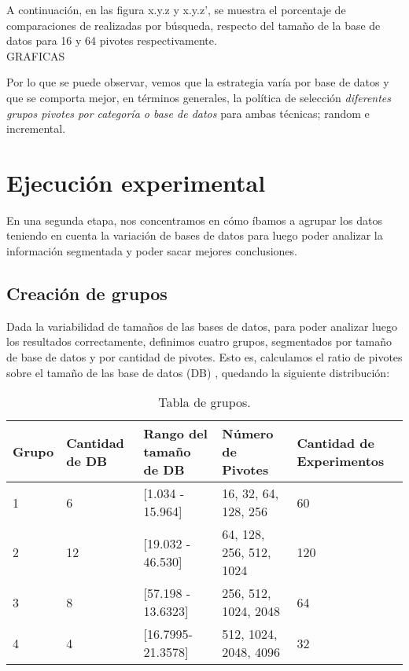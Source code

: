 A continuaci\'on, en las figura x.y.z y x.y.z’, se muestra el porcentaje de comparaciones de realizadas por b\'usqueda, respecto del tamaño de la base de datos para 16 y 64 pivotes respectivamente.\\

GRAFICAS

Por lo que se puede observar, vemos que la estrategia var\'ia por base de datos y que se comporta mejor, en t\'erminos generales, la pol\'itica de selecci\'on  \textit{diferentes grupos pivotes por categor\'ia o base de datos} para ambas t\'ecnicas; random e incremental.\\


\section{Ejecuci\'on experimental}

En una segunda etapa,  nos concentramos en c\'omo \'ibamos a agrupar los datos teniendo en cuenta la variaci\'on de bases de datos para luego poder analizar la informaci\'on segmentada y poder sacar mejores conclusiones.\\

\subsection{Creaci\'on de grupos}

Dada la variabilidad de tamaños de las bases de datos, para poder analizar luego los resultados correctamente, definimos cuatro grupos, segmentados por tamaño de base de datos y por cantidad de pivotes. Esto es, calculamos el ratio de pivotes sobre el tamaño de las base de datos (DB) , quedando la siguiente distribuci\'on:\\

\begin{table}[htbp]
\begin{center}
\begin{tabular}{|m{1.1cm}|m{1.8cm}|m{3.2cm}|m{2.2cm}|m{2.5cm}|}

\hline
Grupo & 
Cantidad de DB & 
Rango del tama\~no de DB & 
N\'umero de Pivotes &  
Cantidad de Experimentos\\
\hline \hline
1 & 
6 & 
[1.034 - 15.964] & 
16, 32, 64, 128, 256 & 
60  \\ \hline
2 &
12 &
[19.032 - 46.530] &
64, 128, 256, 512, 1024 &
120  \\ \hline
3 &
8 &
[57.198 - 13.6323] &
256, 512, 1024, 2048 &
64  \\ \hline
4 &
4 &
[16.7995- 21.3578] &
512, 1024, 2048, 4096 &
32  \\ \hline
\end{tabular}
\caption{Tabla de grupos.}
\label{tabla:grupos}
\end{center}
\end{table}

